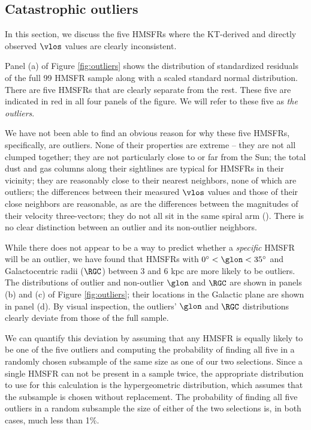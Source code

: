 \subsection{Catastrophic outliers}
\label{sec:discussion-catastrophic}
In this section, we discuss the five HMSFRs where the KT-derived and directly observed $\vlos$ values are clearly inconsistent.

Panel (a) of Figure \ref{fig:outliers} shows the distribution of standardized residuals of the full 99 HMSFR sample along with a scaled standard normal distribution.
There are five HMSFRs that are clearly separate from the rest. 
These five are indicated in red in all four panels of the figure.
We will refer to these five as \emph{the outliers}.



We have not been able to find an obvious reason for why these five HMSFRs, specifically, are outliers. 
None of their properties are extreme -- they are not all clumped together; they are not particularly close to or far from the Sun; the total dust and gas columns along their sightlines are typical for HMSFRs in their vicinity; they are reasonably close to their nearest neighbors, none of which are outliers; the differences between their measured $\vlos$ values and those of their close neighbors are reasonable, as are the differences between the magnitudes of their velocity three-vectors; they do not all sit in the same spiral arm (\Reid{}). 
There is no clear distinction between an outlier and its non-outlier neighbors. 

While there does not appear to be a way to predict whether a \emph{specific} HMSFR will be an outlier, we have found that HMSFRs with $0^\circ < \glon < 35^\circ$ and Galactocentric radii ($\RGC$) between 3 and 6 kpc are more likely to be outliers. 
The distributions of outlier and non-outlier $\glon$ and $\RGC$ are shown in panels (b) and (c) of Figure \ref{fig:outliers}; their locations in the Galactic plane are shown in panel (d).
By visual inspection, the outliers' $\glon$ and $\RGC$ distributions clearly deviate from those of the full sample.

We can quantify this deviation by assuming that any HMSFR is equally likely to be one of the five outliers and computing the probability of finding all five in a randomly chosen subsample of the same size as one of our two selections.
Since a single HMSFR can not be present in a sample twice, the appropriate distribution to use for this calculation is the hypergeometric distribution, which assumes that the subsample is chosen without replacement.
The probability of finding all five outliers in a random subsample the size of either of the two selections is, in both cases, much less than 1\%.

